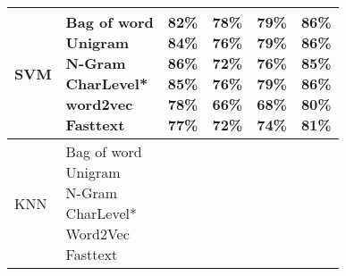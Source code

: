 \documentclass[11pt]{article}
\begin{document}
\begin{table*}[H]
\begin{tabular}{llllll}
SVM & \makecell{Bag of word\\  Unigram\\ N-Gram\\CharLevel* \\ word2vec \\Fasttext} & 
\makecell{82\% \\84\%\\ \textbf{86\%}\\ 85\%\\ 78\% \\77\%}&
\makecell{\textbf{78\%} \\ 76\%\\ 72\%\\ 76\%\\ 66\% \\72\%}&
\makecell{\textbf{79\%} \\ \textbf{79\%}\\76\%\\\textbf{ 79\%}\\ 68\% \\74\%}&
\makecell{\textbf{86\%} \\ 86\%\\85\%\\ \textbf{86\%}\\  80\% \\81\%}\\
\hline
KNN & \makecell{Bag of word\\  Unigram\\ N-Gram\\CharLevel*\\ Word2Vec \\ Fasttext} & 

\end{tabular}
\end{table*}
\end{document}
